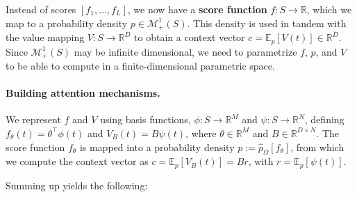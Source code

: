 \documentclass{article}
\newcommand{\remove}[1]{}
\begin{document}
Instead of scores $[f_1, \ldots, f_L]$, we now have a {\bf score function} $f: S  \rightarrow
\mathbb{R}$, which we map to a probability density $p \in \mathcal{M}_+^1(S)$. 
This density is used in tandem with the  value mapping $V: S \rightarrow \mathbb{R}^D$ to obtain a context vector $c = \mathbb{E}_{p} [V(t)]  \in \mathbb{R}^D$. 
Since $\mathcal{M}_+^1(S)$ may be infinite dimensional, we need to parametrize  $f$, $p$, and $V$ to be able to compute in a finite-dimensional parametric space. 


\paragraph{Building attention mechanisms.}
We represent $f$ and $V$ using basis functions, 
$\phi: S \rightarrow \mathbb{R}^M$ and $\psi: S \rightarrow \mathbb{R}^N$, 
defining $f_\theta(t) = \theta^\top \phi(t)$
and $V_B(t) = B\psi(t)$, 
where $\theta \in \mathbb{R}^M$ and $B \in \mathbb{R}^{D \times N}$. The score function $f_\theta$ is mapped into a probability density $p := \hat{p}_{\Omega}[f_\theta]$, 
from which we compute the context vector as $c=\mathbb{E}_{p}[V_B(t)]=Br$,  with $r =\mathbb{E}_{p}[\psi(t)]$. 
\remove{
from which the expectation
$r = \mathbb{E}_{p}[\psi(t)] \in \mathbb{R}^N$ is then obtained.
Given $r$, a context vector is computed as $c = Br$; from the definition of $V_B(t)$, this is equivalent to writing $c = \mathbb{E}_{p}[V_B(t)]$. 
}
Summing up yields the  following:
\vspace{0.1cm}
\begin{comment}
\begin{definition}\label{def:attention_mechanism}
Let $\langle S, \Omega, \phi, \psi \rangle$ be a tuple where $\phi:S\rightarrow \mathbb{R}^M$ and $\psi:S\rightarrow \mathbb{R}^N$ are basis functions,
and $\Omega: \mathcal{M}_+^1(S) \rightarrow \mathbb{R}$ is a regularization functional.
An \textbf{attention mechanism} is a mapping $\rho: \mathbb{R}^M \rightarrow \mathbb{R}^N$ from an input parameter vector $\theta \in \mathbb{R}^M$ to a vector $r \in \mathbb{R}^N$,
\begin{equation}\label{eq:attention_expectation}
    \rho(\theta) = r = \mathbb{E}_{p}[\psi(t)],
\end{equation}
with $p = \hat{p}_\Omega[f_\theta]$ and $f_\theta(t) = \theta^\top \phi(t)$.
If $\Omega = \Omega_\alpha$, we  call this \textbf{entmax} attention, denoted as $\rho_\alpha$. The values $\alpha=1$ and $\alpha=2$ lead to softmax and sparsemax attention, respectively.
\end{definition}
\end{comment}
\end{document}
